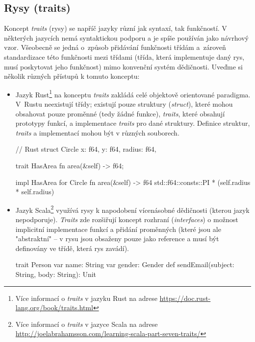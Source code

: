\subsection{Rysy (traits)}
Koncept \textit{traits} (rysy) se napříč jazyky různí jak syntaxí, tak funkčností. V některých jazycích nemá syntaktickou podporu a je spíše používán jako návrhový vzor. Všeobecně se jedná o~způsob přidávání funkčnosti třídám a~zároveň standardizace této funkčnosti mezi třídami (třída, která implementuje daný rys, musí poskytovat jeho funkčnost) mimo konvenční systém dědičnosti. Uveďme si několik různých přístupů k tomuto konceptu:

\begin{itemize}
	\item Jazyk Rust\footnote{Více informací o \textit{traits} v jazyku Rust na adrese \url{https://doc.rust-lang.org/book/traits.html}} na konceptu \textit{traits} zakládá celé objektově orientované paradigma. V~Rustu neexistují třídy; existují pouze struktury (\textit{struct}), které mohou obsahovat pouze proměnné (tedy žádné funkce), \textit{traits}, které obsahují prototypy funkcí, a implementace \textit{traits} pro dané struktury. Definice struktur, \textit{traits} a implementací mohou být v různých souborech.
	\begin{rustcode}
// Rust
struct Circle {
	x: f64,
	y: f64,
	radius: f64,
}

trait HasArea {
	fn area(&self) -> f64;
}

impl HasArea for Circle {
	fn area(&self) -> f64 {
		std::f64::consts::PI * (self.radius * self.radius)
	}
}
	\end{rustcode}
	
	\item Jazyk Scala\footnote{Více informací o \textit{traits} v jazyce Scala na adrese \url{http://joelabrahamsson.com/learning-scala-part-seven-traits/}} využívá rysy k napodobení vícenásobné dědičnosti (kterou jazyk nepodporuje). \textit{Traits} zde rozšiřují koncept rozhraní (\textit{interfaces}) o možnost implicitní implementace funkcí a přidání proměnných (které jsou ale "abstraktní" -- v rysu jsou obsaženy pouze jako reference a musí být definovány ve třídě, která rys zavádí).
	\begin{scalacode}
trait Person {
	var name: String
	var gender: Gender
	def sendEmail(subject: String, body: String): Unit
}


\end{scalacode}
\end{itemize}

